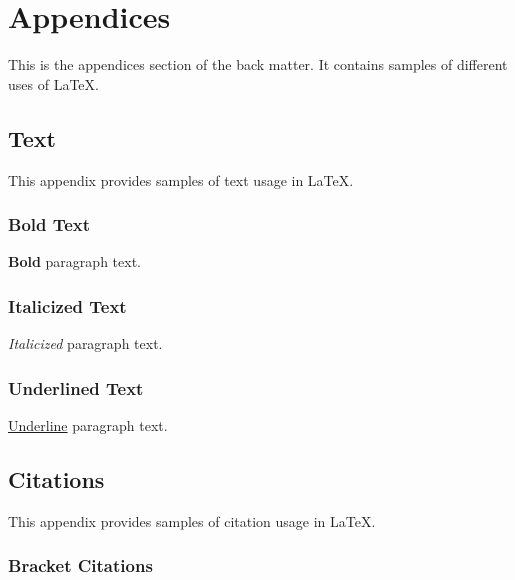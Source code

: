 

\appendix
\chapter*{Appendices} \label{appendices}

\renewcommand{\thesection}{\Alph{section}}
\setcounter{figure}{0}
\renewcommand\thefigure{\thesection.\arabic{figure}}
\setcounter{table}{0}
\renewcommand\thetable{\thesection.\arabic{table}}

This is the appendices section of the back matter. It contains samples of different uses of LaTeX.


\section{Text} \label{text}

This appendix provides samples of text usage in LaTeX.

\subsection{Bold Text} \label{bold-text}

\textbf{Bold} paragraph text.

\subsection{Italicized Text} \label{italicized-text}

\textit{Italicized} paragraph text.

\subsection{Underlined Text} \label{underlined-text}

\underline{Underline} paragraph text.


\section{Citations} \label{citations}

This appendix provides samples of citation usage in LaTeX.

\subsection{Bracket Citations} \label{bracket-citations}

